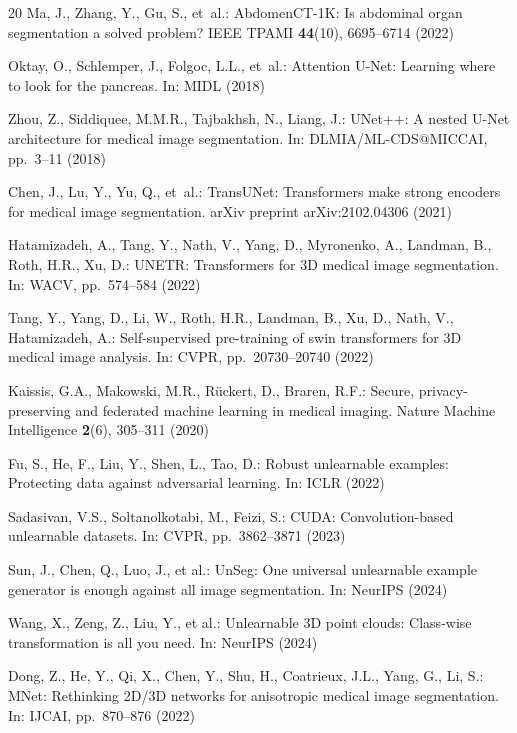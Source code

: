 \documentclass[runningheads]{llncs}
\begin{document}
\begin{thebibliography}{20}
Ma, J., Zhang, Y., Gu, S., et~al.:
AbdomenCT-1K: Is abdominal organ segmentation a solved problem?
IEEE TPAMI \textbf{44}(10), 6695--6714 (2022)

Oktay, O., Schlemper, J., Folgoc, L.L., et~al.:
Attention U-Net: Learning where to look for the pancreas.
In: MIDL (2018)

Zhou, Z., Siddiquee, M.M.R., Tajbakhsh, N., Liang, J.:
UNet++: A nested U-Net architecture for medical image segmentation.
In: DLMIA/ML-CDS@MICCAI, pp.~3--11 (2018)

Chen, J., Lu, Y., Yu, Q., et~al.:
TransUNet: Transformers make strong encoders for medical image segmentation.
arXiv preprint arXiv:2102.04306 (2021)

Hatamizadeh, A., Tang, Y., Nath, V., Yang, D., Myronenko, A., Landman, B., Roth, H.R., Xu, D.:
UNETR: Transformers for 3D medical image segmentation.
In: WACV, pp.~574--584 (2022)

Tang, Y., Yang, D., Li, W., Roth, H.R., Landman, B., Xu, D., Nath, V., Hatamizadeh, A.:
Self-supervised pre-training of swin transformers for 3D medical image analysis.
In: CVPR, pp.~20730--20740 (2022)

Kaissis, G.A., Makowski, M.R., R\"{u}ckert, D., Braren, R.F.:
Secure, privacy-preserving and federated machine learning in medical imaging.
Nature Machine Intelligence \textbf{2}(6), 305--311 (2020)

Fu, S., He, F., Liu, Y., Shen, L., Tao, D.:
Robust unlearnable examples: Protecting data against adversarial learning.
In: ICLR (2022)

Sadasivan, V.S., Soltanolkotabi, M., Feizi, S.:
CUDA: Convolution-based unlearnable datasets.
In: CVPR, pp.~3862--3871 (2023)

Sun, J., Chen, Q., Luo, J., et al.:
UnSeg: One universal unlearnable example generator is enough against all image segmentation.
In: NeurIPS (2024)

Wang, X., Zeng, Z., Liu, Y., et al.:
Unlearnable 3D point clouds: Class-wise transformation is all you need.
In: NeurIPS (2024)

Dong, Z., He, Y., Qi, X., Chen, Y., Shu, H., Coatrieux, J.L., Yang, G., Li, S.:
MNet: Rethinking 2D/3D networks for anisotropic medical image segmentation.
In: IJCAI, pp.~870--876 (2022)



\end{thebibliography}
\end{document}
